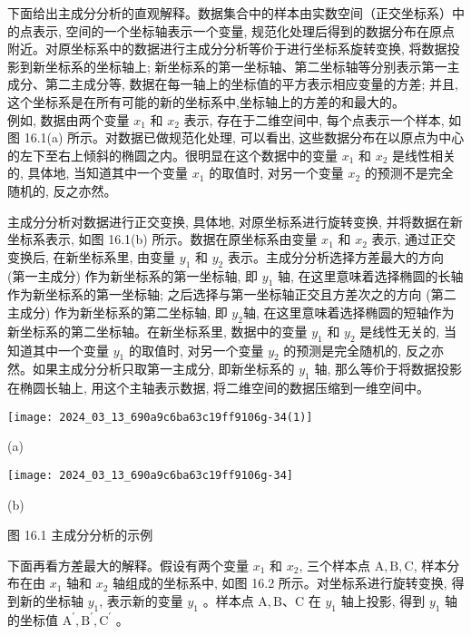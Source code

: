 \documentclass[10pt]{article}
\begin{document}
下面给出主成分分析的直观解释。数据集合中的样本由实数空间（正交坐标系）中的点表示, 空间的一个坐标轴表示一个变量, 规范化处理后得到的数据分布在原点附近。对原坐标系中的数据进行主成分分析等价于进行坐标系旋转变换, 将数据投影到新坐标系的坐标轴上; 新坐标系的第一坐标轴、第二坐标轴等分别表示第一主成分、第二主成分等, 数据在每一轴上的坐标值的平方表示相应变量的方差; 并且, 这个坐标系是在所有可能的新的坐标系中,坐标轴上的方差的和最大的。\\
例如, 数据由两个变量 $x_{1}$ 和 $x_{2}$ 表示, 存在于二维空间中, 每个点表示一个样本, 如图 16.1(a) 所示。对数据已做规范化处理, 可以看出, 这些数据分布在以原点为中心的左下至右上倾斜的椭圆之内。很明显在这个数据中的变量 $x_{1}$ 和 $x_{2}$ 是线性相关的, 具体地, 当知道其中一个变量 $x_{1}$ 的取值时, 对另一个变量 $x_{2}$ 的预测不是完全随机的, 反之亦然。

主成分分析对数据进行正交变换, 具体地, 对原坐标系进行旋转变换, 并将数据在新坐标系表示, 如图 16.1(b) 所示。数据在原坐标系由变量 $x_{1}$ 和 $x_{2}$ 表示, 通过正交变换后, 在新坐标系里, 由变量 $y_{1}$ 和 $y_{2}$ 表示。主成分分析选择方差最大的方向 (第一主成分) 作为新坐标系的第一坐标轴, 即 $y_{1}$ 轴, 在这里意味着选择椭圆的长轴作为新坐标系的第一坐标轴; 之后选择与第一坐标轴正交且方差次之的方向 (第二主成分) 作为新坐标系的第二坐标轴, 即 $y_{2}$轴, 在这里意味着选择椭圆的短轴作为新坐标系的第二坐标轴。在新坐标系里, 数据中的变量 $y_{1}$ 和 $y_{2}$ 是线性无关的, 当知道其中一个变量 $y_{1}$ 的取值时, 对另一个变量 $y_{2}$ 的预测是完全随机的, 反之亦然。如果主成分分析只取第一主成分, 即新坐标系的 $y_{1}$ 轴, 那么等价于将数据投影在椭圆长轴上, 用这个主轴表示数据, 将二维空间的数据压缩到一维空间中。

\begin{center}
\texttt{[image: 2024\_03\_13\_690a9c6ba63c19ff9106g-34(1)]}
\end{center}

(a)

\begin{center}
\texttt{[image: 2024\_03\_13\_690a9c6ba63c19ff9106g-34]}
\end{center}

(b)

图 16.1 主成分分析的示例

下面再看方差最大的解释。假设有两个变量 $x_{1}$ 和 $x_{2}$, 三个样本点 $\mathrm{A}, \mathrm{B}, \mathrm{C}$, 样本分布在由 $x_{1}$ 轴和 $x_{2}$ 轴组成的坐标系中, 如图 16.2 所示。对坐标系进行旋转变换, 得到新的坐标轴 $y_{1}$, 表示新的变量 $y_{1}$ 。样本点 $\mathrm{A}, \mathrm{B} 、 \mathrm{C}$ 在 $y_{1}$ 轴上投影, 得到 $y_{1}$ 轴的坐标值 $\mathrm{A}^{\prime}, \mathrm{B}^{\prime}, \mathrm{C}^{\prime}$ 。
\end{document}
